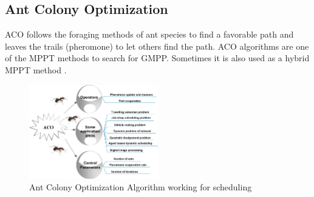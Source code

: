 \documentclass{article}
\begin{document}
\subsection{Ant Colony Optimization}
ACO follows the foraging methods of ant species to find a favorable path and leaves the trails (pheromone) to let others find the path. ACO algorithms are one of the MPPT methods to search for GMPP. Sometimes it is also used as a hybrid MPPT method \cite{mamur2022future}. 
\vspace{1em}

\begin{figure}[ht]
  \centering
  \includegraphics[width=0.5\textwidth]{ACO.png} 
  \caption{Ant Colony Optimization Algorithm working for scheduling \cite{rajan2015investigation}}
  \label{fig:image1}
\end{figure}
\end{document}
